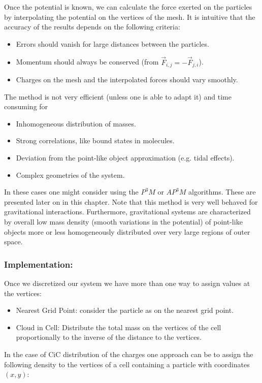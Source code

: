 \noindent
Once the potential is known, we can calculate the force exerted on the particles by interpolating the potential on the vertices of the mesh. It is intuitive that the accuracy of the results depends on the following criteria:
\begin{itemize}
\item Errors should vanish for large distances between the particles.
\item Momentum should always be conserved (from $\vec{F}_{i,j}=-\vec{F}_{j,i}$).
\item Charges on the mesh and the interpolated forces should vary smoothly.
\end{itemize}
The method is not very efficient (unless one is able to adapt it) and time consuming for
\begin{itemize}
\item Inhomogeneous distribution of masses.
\item Strong correlations, like bound states in molecules.
\item Deviation from the point-like object approximation (e.g. tidal effects).
\item Complex geometries of the system.
\end{itemize} 
In these cases one might consider using the $P^3M$ or $AP^3M$ algorithms. These are presented later on in this chapter. Note that this method is very well behaved for gravitational interactions. Furthermore, gravitational systems are characterized by overall low mass density (smooth variations in the potential) of point-like objects more or less homogeneously distributed over very large regions of outer space. 

\subsubsection*{Implementation:}
Once we discretized our system we have more than one way to assign values at the vertices:

\begin{itemize}
\item Nearest Grid Point: consider the particle as on the nearest grid point.
\item Cloud in Cell: Distribute the total mass on the vertices of the cell proportionally to the inverse of the distance to the vertices.
\end{itemize}

In the case of CiC distribution of the charges one approach can be to assign the following density to the vertices of a cell containing a particle with coordinates $(x,y)$:

